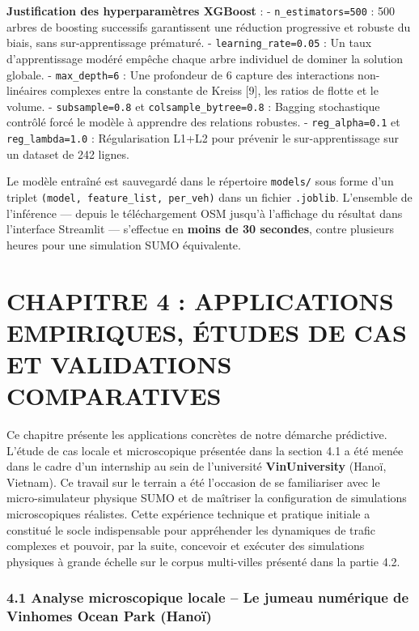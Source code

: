 \documentclass[10pt, a4paper]{article}
\begin{document}
\textbf{Justification des hyperparamètres XGBoost} : -
\texttt{n\_estimators=500} : 500 arbres de boosting successifs
garantissent une réduction progressive et robuste du biais, sans
sur-apprentissage prématuré. - \texttt{learning\_rate=0.05} : Un taux
d'apprentissage modéré empêche chaque arbre individuel de dominer la
solution globale. - \texttt{max\_depth=6} : Une profondeur de 6 capture
des interactions non-linéaires complexes entre la constante de Kreiss
{[}9{]}, les ratios de flotte et le volume. - \texttt{subsample=0.8} et
\texttt{colsample\_bytree=0.8} : Bagging stochastique contrôlé forcé le
modèle à apprendre des relations robustes. - \texttt{reg\_alpha=0.1} et
\texttt{reg\_lambda=1.0} : Régularisation L1+L2 pour prévenir le
sur-apprentissage sur un dataset de 242 lignes.

Le modèle entraîné est sauvegardé dans le répertoire \texttt{models/}
sous forme d'un triplet
\texttt{(model,\ feature\_list,\ \textquotesingle{}per\_veh\textquotesingle{})}
dans un fichier \texttt{.joblib}. L'ensemble de l'inférence --- depuis
le téléchargement OSM jusqu'à l'affichage du résultat dans l'interface
Streamlit --- s'effectue en \textbf{moins de 30 secondes}, contre
plusieurs heures pour une simulation SUMO équivalente.

\newpage

\section{CHAPITRE 4 : APPLICATIONS EMPIRIQUES, ÉTUDES DE CAS ET
VALIDATIONS
COMPARATIVES}\label{chapitre-4-applications-empiriques-uxe9tudes-de-cas-et-validations-comparatives}

Ce chapitre présente les applications concrètes de notre démarche
prédictive. L'étude de cas locale et microscopique présentée dans la
section 4.1 a été menée dans le cadre d'un internship au sein de
l'université \textbf{VinUniversity} (Hanoï, Vietnam). Ce travail sur le
terrain a été l'occasion de se familiariser avec le micro-simulateur
physique SUMO et de maîtriser la configuration de simulations
microscopiques réalistes. Cette expérience technique et pratique
initiale a constitué le socle indispensable pour appréhender les
dynamiques de trafic complexes et pouvoir, par la suite, concevoir et
exécuter des simulations physiques à grande échelle sur le corpus
multi-villes présenté dans la partie 4.2.

\subsubsection{4.1 Analyse microscopique locale -- Le jumeau numérique
de Vinhomes Ocean Park
(Hanoï)}\label{analyse-microscopique-locale-le-jumeau-numuxe9rique-de-vinhomes-ocean-park-hanouxef}
\end{document}
